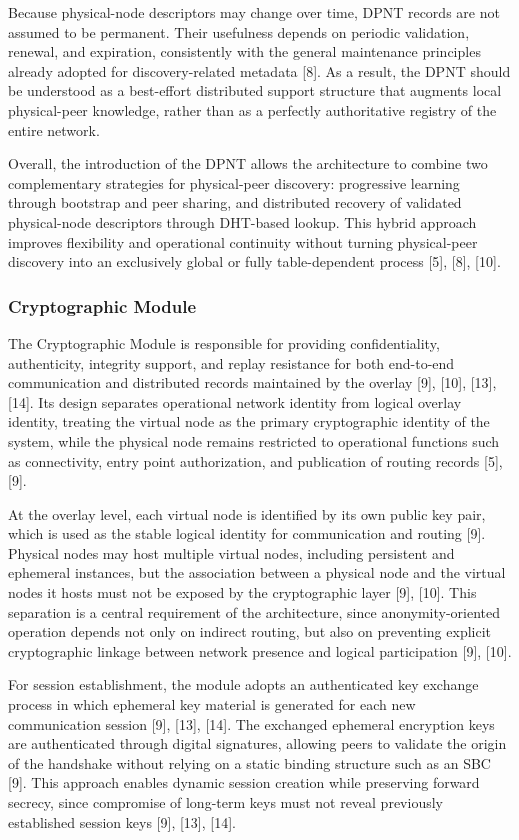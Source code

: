 \documentclass[12pt,a4paper]{article}
\begin{document}
Because physical-node descriptors may change over time, DPNT records are not assumed to be permanent. Their usefulness depends on periodic validation, renewal, and expiration, consistently with the general maintenance principles already adopted for discovery-related metadata [8]. As a result, the DPNT should be understood as a best-effort distributed support structure that augments local physical-peer knowledge, rather than as a perfectly authoritative registry of the entire network.

Overall, the introduction of the DPNT allows the architecture to combine two complementary strategies for physical-peer discovery: progressive learning through bootstrap and peer sharing, and distributed recovery of validated physical-node descriptors through DHT-based lookup. This hybrid approach improves flexibility and operational continuity without turning physical-peer discovery into an exclusively global or fully table-dependent process [5], [8], [10].




\subsubsection{Cryptographic Module}

The Cryptographic Module is responsible for providing confidentiality, authenticity, integrity support, and replay resistance for both end-to-end communication and distributed records maintained by the overlay [9], [10], [13], [14]. Its design separates operational network identity from logical overlay identity, treating the virtual node as the primary cryptographic identity of the system, while the physical node remains restricted to operational functions such as connectivity, entry point authorization, and publication of routing records [5], [9]. 

At the overlay level, each virtual node is identified by its own public key pair, which is used as the stable logical identity for communication and routing [9]. Physical nodes may host multiple virtual nodes, including persistent and ephemeral instances, but the association between a physical node and the virtual nodes it hosts must not be exposed by the cryptographic layer [9], [10]. This separation is a central requirement of the architecture, since anonymity-oriented operation depends not only on indirect routing, but also on preventing explicit cryptographic linkage between network presence and logical participation [9], [10].

For session establishment, the module adopts an authenticated key exchange process in which ephemeral key material is generated for each new communication session [9], [13], [14]. The exchanged ephemeral encryption keys are authenticated through digital signatures, allowing peers to validate the origin of the handshake without relying on a static binding structure such as an SBC [9]. This approach enables dynamic session creation while preserving forward secrecy, since compromise of long-term keys must not reveal previously established session keys [9], [13], [14].
\end{document}
